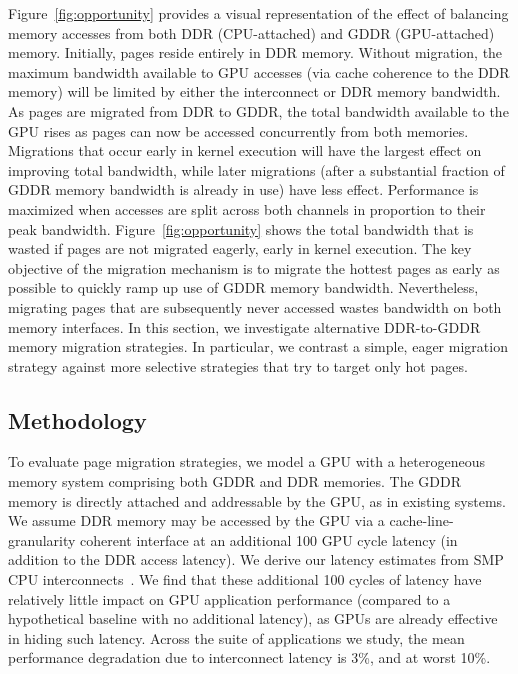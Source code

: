 Figure~\ref{fig:opportunity} provides a visual representation of the effect of balancing memory accesses
from both DDR (CPU-attached) and GDDR (GPU-attached) memory. Initially, pages reside entirely in DDR memory. 
Without migration, the maximum bandwidth available to GPU accesses (via cache coherence to the DDR memory)  
will be limited by either the interconnect
or DDR memory bandwidth.  As pages are migrated from DDR to GDDR, the total bandwidth
available to the GPU rises as pages can now be accessed concurrently from both memories.
Migrations that occur early in kernel execution will have the largest effect on improving total bandwidth, while later migrations
(after a substantial fraction of GDDR memory bandwidth is already in use) have less effect.  Performance is maximized when 
accesses are split across both channels in proportion to their peak bandwidth.  Figure~\ref{fig:opportunity}
shows the total bandwidth that is wasted if pages are not migrated eagerly, early in kernel execution.  
The key objective of the migration mechanism is to migrate the hottest pages as early as possible to quickly ramp up use
of GDDR memory bandwidth.  Nevertheless, migrating pages that are subsequently never accessed wastes bandwidth on
both memory interfaces.
In this section, we investigate alternative DDR-to-GDDR memory migration strategies.  In particular, we contrast a simple, 
eager migration strategy against more selective strategies that try to target only hot pages.

\subsection{Methodology}
To evaluate page migration strategies, we model a GPU with a heterogeneous 
memory system comprising both  GDDR and DDR memories.  The GDDR memory is 
directly attached and addressable by the GPU, as in existing systems.  We assume 
DDR memory may be accessed by the GPU via a cache-line-granularity coherent 
interface at an additional 100 GPU cycle latency (in addition to the DDR access 
latency).  We derive our latency estimates from SMP CPU 
interconnects~\cite{INTELXEON}.  We find that these additional 100 cycles of 
latency have relatively little impact on GPU application performance (compared 
to a hypothetical baseline with no additional latency), as GPUs are already 
effective in hiding such latency.  Across the suite of applications we study, 
the mean performance degradation due to interconnect latency is 3\%, and at 
worst 10\%.

